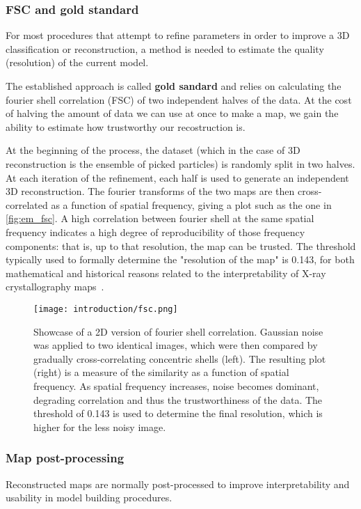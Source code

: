 \subsubsection{FSC and gold standard}\label{em_fsc}
For most procedures that attempt to refine parameters in order to improve a 3D classification or reconstruction, a method is needed to estimate the quality (resolution) of the current model.

The established approach is called \textbf{gold sandard} and relies on calculating the fourier shell correlation (FSC) of two independent halves of the data.
At the cost of halving the amount of data we can use at once to make a map, we gain the ability to estimate how trustworthy our recostruction is.

At the beginning of the process, the dataset (which in the case of 3D reconstruction is the ensemble of picked particles) is randomly split in two halves.
At each iteration of the refinement, each half is used to generate an independent 3D reconstruction.
The fourier transforms of the two maps are then cross-correlated as a function of spatial frequency, giving a plot such as the one in \autoref{fig:em_fsc}.
A high correlation between fourier shell at the same spatial frequency indicates a high degree of reproducibility of those frequency components: that is, up to that resolution, the map can be trusted.
The threshold typically used to formally determine the "resolution of the map" is \num{0.143}, for both mathematical and historical reasons related to the interpretability of X-ray crystallography maps~\cite{rosenthalOptimalDeterminationParticle2003}.

\begin{figure}[ht]
    \centering
    \texttt{[image: introduction/fsc.png]}
    \caption[Fourier shell correlation]{Showcase of a 2D version of fourier shell correlation. Gaussian noise was applied to two identical images, which were then compared by gradually cross-correlating concentric shells (left). The resulting plot (right) is a measure of the similarity as a function of spatial frequency. As spatial frequency increases, noise becomes dominant, degrading correlation and thus the trustworthiness of the data. The threshold of \num{0.143} is used to determine the final resolution, which is higher for the less noisy image.}
    \label{fig:em_fsc}
\end{figure}

\subsubsection{Map post-processing}
Reconstructed maps are normally post-processed to improve interpretability and usability in model building procedures.

